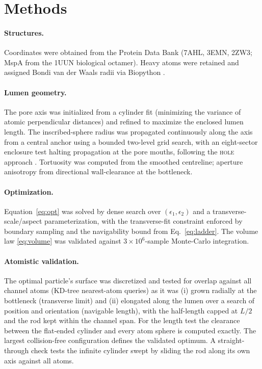 \documentclass[aps,pre,twocolumn,superscriptaddress,floatfix,nofootinbib]{revtex4-2}
\begin{document}
\section{Methods}
\label{sec:methods}

\paragraph{Structures.} Coordinates were obtained from the Protein Data Bank
(7AHL, 3EMN, 2ZW3; MspA from the 1UUN biological octamer). Heavy atoms were
retained and assigned Bondi van der Waals radii \cite{bondi1964} via Biopython
\cite{cock2009biopython}.

\paragraph{Lumen geometry.} The pore axis was initialized from a cylinder fit
(minimizing the variance of atomic perpendicular distances) and refined to
maximize the enclosed lumen length. The inscribed-sphere radius was propagated
continuously along the axis from a central anchor using a bounded two-level grid
search, with an eight-sector enclosure test halting propagation at the pore
mouths, following the \textsc{hole} approach \cite{smart1996hole}. Tortuosity was
computed from the smoothed centreline; aperture anisotropy from directional
wall-clearance at the bottleneck.

\paragraph{Optimization.} Equation~\eqref{eq:opt} was solved by dense search over
$(\epsilon_1,\epsilon_2)$ and a transverse-scale/aspect parameterization, with
the transverse-fit constraint enforced by boundary sampling and the navigability
bound from Eq.~\eqref{eq:ladder}. The volume law \eqref{eq:volume} was validated
against $3\times10^6$-sample Monte-Carlo integration.

\paragraph{Atomistic validation.} The optimal particle's surface was discretized
and tested for overlap against all channel atoms (KD-tree nearest-atom queries)
as it was (i) grown radially at the bottleneck (transverse limit) and (ii)
elongated along the lumen over a search of position and orientation
(navigable length), with the half-length capped at $L/2$ and the rod kept within
the channel span. For the length test the clearance between the flat-ended
cylinder and every atom sphere is computed exactly. The largest collision-free
configuration defines the validated optimum. A straight-through check tests the
infinite cylinder swept by sliding the rod along its own axis against all atoms.
\end{document}
